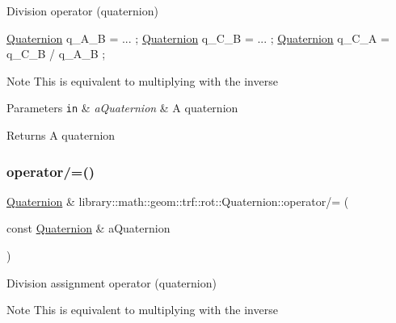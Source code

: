 Division operator (quaternion) 


\begin{DoxyCode}
\hyperlink{classlibrary_1_1math_1_1geom_1_1trf_1_1rot_1_1_quaternion_aa7f459a08f5af38b9f7676a6bf36a21c}{Quaternion} q\_A\_B = ... ;
\hyperlink{classlibrary_1_1math_1_1geom_1_1trf_1_1rot_1_1_quaternion_aa7f459a08f5af38b9f7676a6bf36a21c}{Quaternion} q\_C\_B = ... ;
\hyperlink{classlibrary_1_1math_1_1geom_1_1trf_1_1rot_1_1_quaternion_aa7f459a08f5af38b9f7676a6bf36a21c}{Quaternion} q\_C\_A = q\_C\_B / q\_A\_B ;
\end{DoxyCode}


\begin{DoxyNote}{Note}
This is equivalent to multiplying with the inverse
\end{DoxyNote}

\begin{DoxyParams}[1]{Parameters}
\mbox{\tt in}  & {\em a\+Quaternion} & A quaternion \\
\hline
\end{DoxyParams}
\begin{DoxyReturn}{Returns}
A quaternion 
\end{DoxyReturn}
\mbox{\label{classlibrary_1_1math_1_1geom_1_1trf_1_1rot_1_1_quaternion_aadd92f2fb9ee7628556fc82dba97313e}} 
\subsubsection{\texorpdfstring{operator/=()}{operator/=()}}
{\footnotesize\ttfamily \hyperlink{classlibrary_1_1math_1_1geom_1_1trf_1_1rot_1_1_quaternion}{Quaternion} \& library\+::math\+::geom\+::trf\+::rot\+::\+Quaternion\+::operator/= (\begin{DoxyParamCaption}\item[{const \hyperlink{classlibrary_1_1math_1_1geom_1_1trf_1_1rot_1_1_quaternion}{Quaternion} \&}]{a\+Quaternion }\end{DoxyParamCaption})}



Division assignment operator (quaternion) 

\begin{DoxyNote}{Note}
This is equivalent to multiplying with the inverse
\end{DoxyNote}

